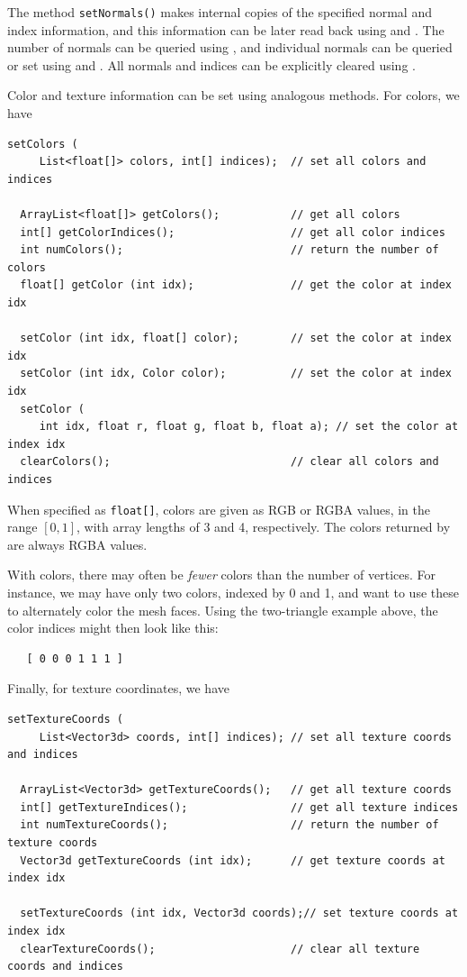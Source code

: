The method {\tt setNormals()} makes internal copies of the specified
normal and index information, and this information can be
later read back using 
and
.
The number of normals can be queried using
,
and individual normals can be queried or set using
and
.
All normals and indices can be explicitly cleared using 
.

Color and texture information can be set using analogous methods.
For colors, we have
\begin{lstlisting}[]
  setColors (
     List<float[]> colors, int[] indices);  // set all colors and indices

  ArrayList<float[]> getColors();           // get all colors
  int[] getColorIndices();                  // get all color indices
  int numColors();                          // return the number of colors
  float[] getColor (int idx);               // get the color at index idx

  setColor (int idx, float[] color);        // set the color at index idx
  setColor (int idx, Color color);          // set the color at index idx
  setColor (
     int idx, float r, float g, float b, float a); // set the color at index idx
  clearColors();                            // clear all colors and indices
\end{lstlisting}
%
When specified as {\tt float[]}, colors are given as RGB or
RGBA values, in the range $[0,1]$, with array lengths of 3 and 4,
respectively.  The colors returned by
 are always RGBA
values.

%
With colors, there may often be {\it fewer} colors than the number of
vertices. For instance, we may have only two colors, indexed by 0 and
1, and want to use these to alternately color the mesh faces. Using
the two-triangle example above, the color indices might then look like
this:
%
\begin{verbatim}
   [ 0 0 0 1 1 1 ]
\end{verbatim}
%

Finally, for texture coordinates, we have
\begin{lstlisting}[]
  setTextureCoords (
     List<Vector3d> coords, int[] indices); // set all texture coords and indices

  ArrayList<Vector3d> getTextureCoords();   // get all texture coords
  int[] getTextureIndices();                // get all texture indices
  int numTextureCoords();                   // return the number of texture coords
  Vector3d getTextureCoords (int idx);      // get texture coords at index idx

  setTextureCoords (int idx, Vector3d coords);// set texture coords at index idx
  clearTextureCoords();                     // clear all texture coords and indices
\end{lstlisting}


